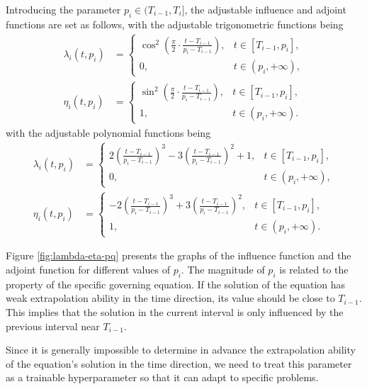 \documentclass[preprint]{elsarticle}
\numberwithin{table}{section}
\numberwithin{equation}{section}
\numberwithin{figure}{section}
\begin{document}
\begin{CJK}{UTF8}{gbsn}
Introducing the parameter $p_{i} \in(T_{i-1},T_{i}]$, the adjustable influence and adjoint functions are set as follows, with the adjustable trigonometric functions being  
\begin{align}
\lambda_{i}(t,p_{i}) &= 
\begin{cases}
\cos^2\left(\frac{\pi}{2} \cdot \frac{t -T_{i-1}}{p_{i} -T_{i-1}}\right), & t \in [T_{i-1}, p_{i}], \\
0, & t \in (p_{i}, +\infty),
\end{cases}   \\
\eta_{i}(t,p_{i}) &= 
\begin{cases}
\sin^2\left(\frac{\pi}{2} \cdot \frac{t -T_{i-1}}{p_{i} -T_{i-1}}\right), & t \in [T_{i-1}, p_{i}], \\
1 ,& t \in (p_{i}, +\infty).
\end{cases}
\end{align}
with the adjustable polynomial  functions being
\begin{align}\label{eq:lambda}
\lambda_{i}(t,p_{i}) &= 
\begin{cases} 
2\left(\frac{t- T_{i-1}}{p_{i}-T_{i-1}}\right)^3 - 3\left(\frac{t- T_{i-1}}{p_{i}-T_{i-1}}\right)^2+1, & t \in [T_{i-1}, p_{i}], \\
0, & t \in (p_{i}, +\infty),
\end{cases}  \\
\eta_{i}(t,p_{i}) &= 
\begin{cases} 
-2\left(\frac{t- T_{i-1}}{p_{i}-T_{i-1}}\right)^3 + 3\left(\frac{t- T_{i-1}}{p_{i}-T_{i-1}}\right)^2, & t \in [T_{i-1}, p_{i}], \\
1 ,& t \in (p_{i}, +\infty).
\end{cases} 
\end{align}

 

Figure \ref{fig:lambda-eta-pq} presents the graphs of the influence function and the adjoint function for different values of $p_{i}$. The magnitude of $p_{i}$ is related to the property of the specific governing equation. If the solution of the equation has weak extrapolation ability in the time direction, its value should be close to $T_{i-1}$. This implies that the solution in the current interval is only influenced by the previous interval near $T_{i-1}$. 

Since it is generally impossible to determine in advance the extrapolation  ability of the equation's solution in the time direction, we need to treat this parameter as a trainable hyperparameter so that it can adapt to specific problems. 


\end{CJK}
\end{document}
